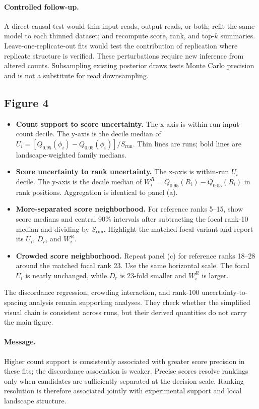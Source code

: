 \documentclass[11pt]{article}
\newcommand{\fit}{\phi}
\begin{document}
\paragraph{Controlled follow-up.}
A direct causal test would thin input reads, output reads, or both; refit the same model to each thinned dataset; and recompute score, rank, and top-$k$ summaries. Leave-one-replicate-out fits would test the contribution of replication where replicate structure is verified. These perturbations require new inference from altered counts. Subsampling existing posterior draws tests Monte Carlo precision and is not a substitute for read downsampling.

\subsection*{Figure 4}

\begin{itemize}
  \item[\textbf{(a)}] \textbf{Count support to score uncertainty.} The x-axis is within-run input-count decile. The y-axis is the decile median of $U_i=[Q_{0.95}(\fit_i)-Q_{0.05}(\fit_i)]/S_{\mathrm{run}}$. Thin lines are runs; bold lines are landscape-weighted family medians.
  \item[\textbf{(b)}] \textbf{Score uncertainty to rank uncertainty.} The x-axis is within-run $U_i$ decile. The y-axis is the decile median of $W_i^R=Q_{0.95}(R_i)-Q_{0.05}(R_i)$ in rank positions. Aggregation is identical to panel (a).
  \item[\textbf{(c)}] \textbf{More-separated score neighborhood.} For reference ranks 5--15, show score medians and central 90\% intervals after subtracting the focal rank-10 median and dividing by $S_{\mathrm{run}}$. Highlight the matched focal variant and report its $U_i$, $D_r$, and $W_i^R$.
  \item[\textbf{(d)}] \textbf{Crowded score neighborhood.} Repeat panel (c) for reference ranks 18--28 around the matched focal rank 23. Use the same horizontal scale. The focal $U_i$ is nearly unchanged, while $D_r$ is 23-fold smaller and $W_i^R$ is larger.
\end{itemize}

The discordance regression, crowding interaction, and rank-100 uncertainty-to-spacing analysis remain supporting analyses. They check whether the simplified visual chain is consistent across runs, but their derived quantities do not carry the main figure.

\paragraph{Message.}
Higher count support is consistently associated with greater score precision in these fits; the discordance association is weaker. Precise scores resolve rankings only when candidates are sufficiently separated at the decision scale. Ranking resolution is therefore associated jointly with experimental support and local landscape structure.
\end{document}
